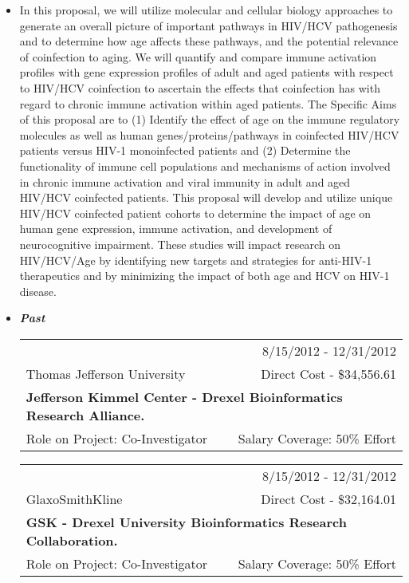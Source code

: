 \documentclass[a4paper,11pt]{article}
\makeatletter
\newenvironment{fullwidth}
    {\par
     \setlength{\@totalleftmargin}{0pt}%
     \setlength{\linewidth}{\hsize}%
     \list{}{\setlength{\leftmargin}{0pt}}
     \item\relax}
    {\endlist}
\makeatother
\begin{document}
\begin{enumerate}
\begin{itemize}
\begin{fullwidth}
In this proposal, we will utilize molecular and cellular biology approaches to generate an overall picture of important pathways in HIV/HCV pathogenesis and to determine how age affects these pathways, and the potential relevance of coinfection to aging. 
We will quantify and compare immune activation profiles with gene expression profiles of adult and aged patients with respect to HIV/HCV coinfection to ascertain the effects that coinfection has with regard to chronic immune activation within aged patients. 
The Specific Aims of this proposal are to (1) Identify the effect of age on the immune regulatory molecules as well as human genes/proteins/pathways in coinfected HIV/HCV patients versus HIV-1 monoinfected patients and (2) Determine the functionality of immune cell populations and mechanisms of action involved in chronic immune activation and viral immunity in adult and aged HIV/HCV coinfected patients. 
This proposal will develop and utilize unique HIV/HCV coinfected patient cohorts to determine the impact of age on human gene expression, immune activation, and development of neurocognitive impairment. 
These studies will impact research on HIV/HCV/Age by identifying new targets and strategies for anti-HIV-1 therapeutics and by minimizing the impact of both age and HCV on HIV-1 disease.
   \end{fullwidth}

 
  
  \item[] {\Large \bfseries \itshape Past}
  \begin{longtable}{lr}
     & 8/15/2012 - 12/31/2012 \\
    Thomas Jefferson University & Direct Cost - \$34,556.61  \\
    \multicolumn{2}{p{0.973\textwidth}}{\bfseries Jefferson Kimmel Center - Drexel Bioinformatics Research Alliance.} \\
    Role on Project:  Co-Investigator & Salary Coverage: 50\% Effort  \\
  \end{longtable}
  \begin{longtable}{lr}
     & 8/15/2012 - 12/31/2012 \\
    GlaxoSmithKline & Direct Cost - \$32,164.01  \\
    \multicolumn{2}{p{0.973\textwidth}}{\bfseries GSK - Drexel University Bioinformatics Research Collaboration.} \\
    Role on Project:  Co-Investigator & Salary Coverage: 50\% Effort  \\
  \end{longtable}
  

\end{itemize}
\end{enumerate}
\end{document}
